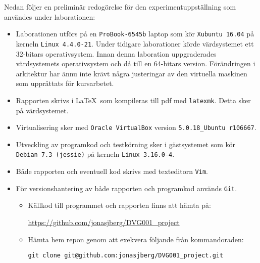 Nedan följer en preliminär redogörelse för den experimentuppställning som
användes under laborationen:

\begin{itemize}
  \item Laborationen utförs på en \texttt{ProBook-6545b} laptop som kör
        \texttt{Xubuntu 16.04} på kerneln \texttt{Linux 4.4.0-21}.  Under
        tidigare laborationer körde värdsystemet ett 32-bitars operativsystem.
        Innan denna laboration uppgraderades värdsystemets operativsystem och
        då till en 64-bitars version. Förändringen i arkitektur har ännu inte
        krävt några justeringar av den virtuella maskinen som upprättats för
        kursarbetet.

  \item Rapporten skrivs i \LaTeX\  som kompileras till pdf med \texttt{latexmk}.
        Detta sker på värdsystemet.

  \item Virtualisering sker med \texttt{Oracle VirtualBox} version
        \texttt{5.0.18\_Ubuntu r106667}.

  \item Utveckling av programkod och testkörning sker i gästsystemet som kör
        \texttt{Debian 7.3 (jessie)} på kerneln \texttt{Linux 3.16.0-4}.

  \item Både rapporten och eventuell kod skrivs med texteditorn \texttt{Vim}.

  \item För versionshantering av både rapporten och programkod används \texttt{Git}.
    \begin{itemize}
      \item Källkod till programmet och rapporten finns att hämta på:

            \url{https://github.com/jonasjberg/DVG001\_project}

      \item Hämta hem repon genom att exekvera följande från kommandoraden:
            
            \texttt{git clone git@github.com:jonasjberg/DVG001\_project.git}

    \end{itemize}
\end{itemize}


